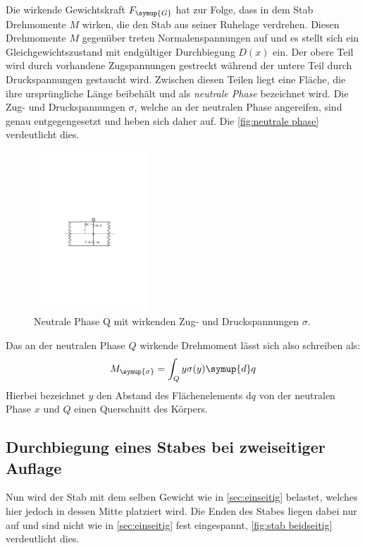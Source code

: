Die wirkende Gewichtskraft $F_{\symup{G}}$ hat zur Folge, dass in dem Stab Drehmomente $M$ wirken, die den Stab aus seiner 
Ruhelage verdrehen. Diesen Drehmomente $M$ gegenüber treten Normalenspannungen auf und es stellt sich ein 
Gleichgewichtszustand mit endgültiger Durchbiegung $D(x)$ ein. Der obere Teil wird durch vorhandene Zugspannungen 
gestreckt während der untere Teil durch Druckspannungen gestaucht wird. Zwischen diesen Teilen liegt eine Fläche, die 
ihre ursprüngliche Länge beibehält und als \textit{neutrale Phase} bezeichnet wird. Die Zug- und Druckspannungen $\sigma$, 
welche an der neutralen Phase angereifen, sind genau entgegengesetzt und heben sich daher auf. 
Die \autoref{fig:neutrale phase} verdeutlicht dies.

\begin{figure} [H]
    \centering
    \includegraphics[height=6cm]{content/Abbildungen/neutrale_phase.pdf}
    \caption{Neutrale Phase Q mit wirkenden Zug- und Druckspannungen $\sigma$. \cite{v103}}
    \label{fig:neutrale phase}
\end{figure}

Das an der neutralen Phase $Q$ wirkende Drehmoment lässt sich also schreiben als:
\begin{equation}
    M_{\symup{\sigma}}=\int_{Q}y\sigma(y)\symup{d}q
    \label{eq:drehmoment neutrale phase}
\end{equation}
Hierbei bezeichnet $y$ den Abstand des Flächenelements d$q$ von der neutralen Phase $x$ und $Q$ einen Querschnitt des Körpers.

\subsection{Durchbiegung eines Stabes bei zweiseitiger Auflage}
\label{sec:zweiseitig}

Nun wird der Stab mit dem selben Gewicht wie in \autoref{sec:einseitig} belastet, welches hier jedoch in dessen Mitte platziert wird.
Die Enden des Stabes liegen dabei nur auf und sind nicht wie in \autoref{sec:einseitig} fest eingespannt,
\autoref{fig:stab beidseitig} verdeutlicht dies.

